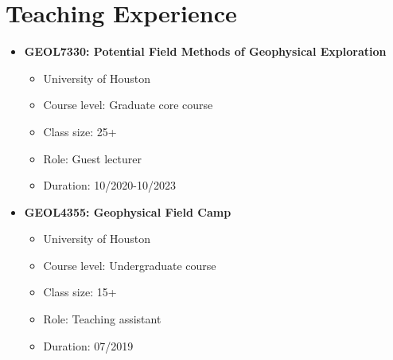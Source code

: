 \documentclass[11pt, a4paper]{article}
\newcommand{\Duration}[2]{\fontsize{10pt}{0}\selectfont #1--#2}
\newcommand{\Year}[1]{\fontsize{10pt}{0}\selectfont #1}
\begin{document}


\section*{Teaching Experience}
\begin{itemize}
	
	\item{\textbf{GEOL7330: Potential Field Methods of Geophysical Exploration}}
	\begin{itemize}
	\item University of Houston
	\item Course level: Graduate core course
	\item Class size: 25+
	\item Role: Guest lecturer
	\item Duration: 10/2020-10/2023
	\end{itemize}
	
	\item{\textbf{GEOL4355: Geophysical Field Camp}}
	\begin{itemize}
	\item University of Houston
	\item Course level: Undergraduate course
	\item Class size: 15+
	\item Role: Teaching assistant
	\item Duration: 07/2019
	\end{itemize}

\end{itemize}


\end{document}
